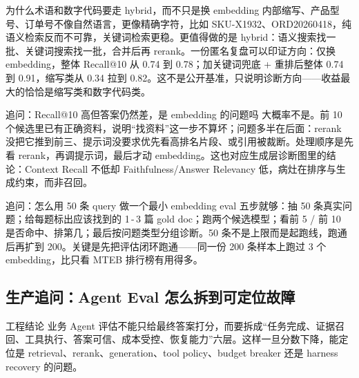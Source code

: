 \documentclass[12pt]{article}
\begin{document}
\begin{summaryBox}{为什么术语和数字代码要走 hybrid，而不只是换 embedding}
内部缩写、产品型号、订单号不像自然语言，更像精确字符，比如 SKU-X1932、ORD20260418，纯语义检索反而不可靠，关键词检索更稳。更值得做的是 hybrid：语义搜索找一批、关键词搜索找一批，合并后再 rerank。一份匿名复盘可以印证方向：仅换 embedding，整体 Recall@10 从 0.74 到 0.78；加关键词兜底 + 重排后整体 0.74 到 0.91，缩写类从 0.34 拉到 0.82。这不是公开基准，只说明诊断方向——收益最大的恰恰是缩写类和数字代码类。
\end{summaryBox}

\begin{qaBox}{追问：Recall@10 高但答案仍然差，是 embedding 的问题吗}
大概率不是。前 10 个候选里已有正确资料，说明“找资料”这一步不算坏；问题多半在后面：rerank 没把它推到前三、提示词没要求优先看高排名片段、或引用被裁断。处理顺序是先看 rerank，再调提示词，最后才动 embedding。这也对应生成层诊断图里的结论：Context Recall 不低却 Faithfulness/Answer Relevancy 低，病灶在排序与生成约束，而非召回。
\end{qaBox}

\begin{qaBox}{追问：怎么用 50 条 query 做一个最小 embedding eval}
五步就够：抽 50 条真实问题；给每题标出应该找到的 1\,-\,3 篇 gold doc；跑两个候选模型；看前 5 / 前 10 是否命中、排第几；最后按问题类型分组诊断。50 条不是上限而是起跑线，跑通后再扩到 200。关键是先把评估闭环跑通——同一份 200 条样本上跑过 3 个 embedding，比只看 MTEB 排行榜有用得多。
\end{qaBox}

\subsection{生产追问：Agent Eval 怎么拆到可定位故障}
\begin{qaBox}{工程结论}
业务 Agent 评估不能只给最终答案打分，而要拆成“任务完成、证据召回、工具执行、答案可信、成本受控、恢复能力”六层。这样一旦分数下降，能定位是 retrieval、rerank、generation、tool policy、budget breaker 还是 harness recovery 的问题。
\end{qaBox}
\end{document}
